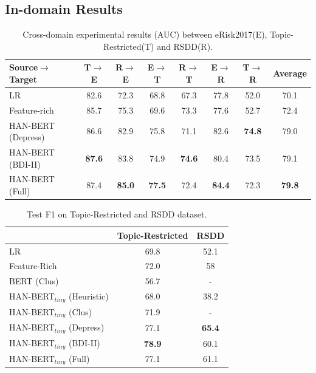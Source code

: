 \documentclass{article}
\begin{document}
\subsection{In-domain Results}


\begin{table}[t]
  \centering
\small
  \begin{tabular}{l|cccccc|c}
      \hline
          Source$\rightarrow$Target & T$\rightarrow$E & R$\rightarrow$E & E$\rightarrow$T & R$\rightarrow$T & E$\rightarrow$R & T$\rightarrow$R & Average  \\ 
          \hline
          LR & 82.6 & 72.3 & 68.8 & 67.3 & 77.8 & 52.0 & 70.1  \\
          Feature-rich & 85.7 & 75.3 & 69.6 & 73.3 & 77.6 & 52.7 & 72.4 \\ 
          \hline
          HAN-BERT (Depress) & 86.6 & 82.9 & 75.8 & 71.1 & 82.6 & \textbf{74.8} & 79.0  \\
          HAN-BERT (BDI-II) & \textbf{87.6} & 83.8 & 74.9 & \textbf{74.6} & 80.4 & 73.5 & 79.1  \\
          HAN-BERT (Full) & 87.4 & \textbf{85.0} & \textbf{77.5} & 72.4 & \textbf{84.4} & 72.3 & \textbf{79.8} \\ 
          \hline
      \end{tabular}
  \caption{Cross-domain experimental results (AUC) between eRisk2017(E), Topic-Restricted(T) and RSDD(R).}
  \label{table:cross} 
\end{table}

\begin{table}[t]
  \centering
  \small
  \begin{tabular}{l|cc}
      \hline
      {} & Topic-Restricted & RSDD \\
      \hline
      LR & 69.8 & 52.1 \\
      Feature-Rich & 72.0 & 58 \\
      \hline
      BERT (Clus) & 56.7 & - \\
      HAN-BERT$_{tiny}$ (Heuristic) & 68.0 & 38.2 \\
      HAN-BERT$_{tiny}$ (Clus) & 71.9 & - \\
      \hline
      HAN-BERT$_{tiny}$ (Depress) & 77.1 & \textbf{65.4} \\
      HAN-BERT$_{tiny}$ (BDI-II) & \textbf{78.9} & 60.1 \\
      HAN-BERT$_{tiny}$ (Full) & 77.1 & 61.1 \\
      \hline
  \end{tabular}
  \caption{Test F1 on Topic-Restricted and RSDD dataset.}
  \label{table:rsdd_wolohan} 
\end{table}
\end{document}
